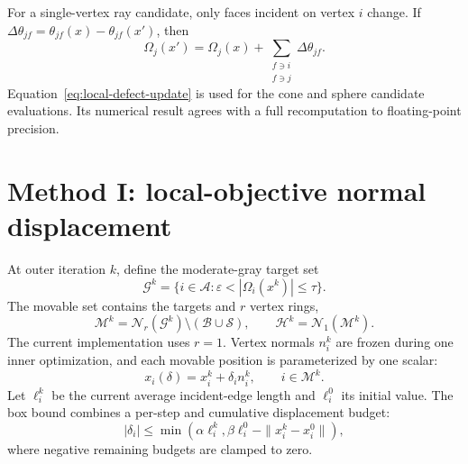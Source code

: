 \documentclass[10pt]{article}
\newcommand{\B}{\mathcal{B}}
\newcommand{\Sset}{\mathcal{S}}
\newcommand{\A}{\mathcal{A}}
\newcommand{\N}{\mathcal{N}}
\newcommand{\eps}{\varepsilon}
\begin{document}
For a single-vertex ray candidate, only faces incident on vertex $i$ change.
If $\Delta\theta_{jf}=\theta_{jf}(x)-\theta_{jf}(x')$, then
\begin{equation}
\Omega_j(x')=\Omega_j(x)+
\sum_{\substack{f\ni i\\f\ni j}}\Delta\theta_{jf}.
\label{eq:local-defect-update}
\end{equation}
Equation~\eqref{eq:local-defect-update} is used for the cone and sphere
candidate evaluations.  Its numerical result agrees with a full recomputation
to floating-point precision.

\section{Method I: local-objective normal displacement}

At outer iteration $k$, define the moderate-gray target set
\begin{equation}
\mathcal{G}^k=\{i\in\A:\eps<|\Omega_i(x^k)|\leq\tau\}.
\end{equation}
The movable set contains the targets and $r$ vertex rings,
\begin{equation}
\mathcal{M}^k=\N_r(\mathcal{G}^k)\setminus(\B\cup\Sset),
\qquad
\mathcal{H}^k=\N_1(\mathcal{M}^k).
\end{equation}
The current implementation uses $r=1$.  Vertex normals $n_i^k$ are frozen
during one inner optimization, and each movable position is parameterized by
one scalar:
\begin{equation}
x_i(\delta)=x_i^k+\delta_i n_i^k,
\qquad i\in\mathcal{M}^k.
\label{eq:normal-param}
\end{equation}
Let $\ell_i^k$ be the current average incident-edge length and $\ell_i^0$ its
initial value.  The box bound combines a per-step and cumulative displacement
budget:
\begin{equation}
|\delta_i|\leq
\min\left(
\alpha\ell_i^k,
\beta\ell_i^0-\|x_i^k-x_i^0\|
\right),
\label{eq:normal-bound}
\end{equation}
where negative remaining budgets are clamped to zero.
\end{document}
